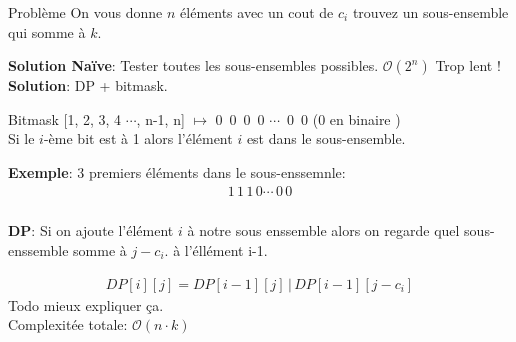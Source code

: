 \begin{frame}
    \frametitle{\problemtitle}
    \begin{block}
        {Problème} On vous donne $n$ éléments avec un cout de $c_i$ trouvez un sous-ensemble qui somme à $k$.
    \end{block}
    \pause
    \textbf{Solution Naïve}: Tester toutes les sous-ensembles possibles. $\mathcal O(2^n)$ Trop lent ! \\
    \pause
    \textbf{Solution}: DP + bitmask. \\
    \pause
    
    \begin{block}{Bitmask}
        [1, 2, 3, 4 $\cdots$, n-1, n] $\mapsto$ 0\, 0\, 0\, 0 $\cdots$\, 0\, 0 (0 en binaire ) \\
        Si le $i$-ème bit est à 1 alors l'élément $i$ est dans le sous-ensemble.
    \end{block}
    \pause
    \textbf{Exemple}: 3 premiers éléments dans le sous-enssemnle:\\
    \begin{align*}
        1\, 1\, 1\, 0 \cdots\, 0\, 0
    \end{align*}
    \pause
\end{frame}
\begin{frame}
    \frametitle{\problemtitle}
    \textbf{DP}: Si on ajoute l'élément $i$ à notre sous enssemble alors on regarde quel sous-enssemble somme à $j-c_i$. à l'éllément i-1.
    
    \begin{align*}
        DP[i][j] = DP[i-1][j] \,|\, DP[i-1][j-c_i]
    \end{align*}
    Todo mieux expliquer ça.\\
    Complexitée totale: $\mathcal O(n \cdot k)$
\end{frame}
